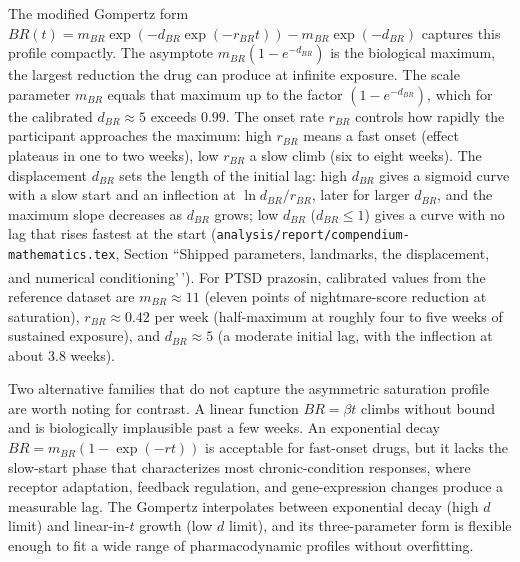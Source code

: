 \documentclass[
  11pt,
]{article}
\begin{document}
The modified Gompertz form \(BR(t) = m_{BR}\exp(-d_{BR}\exp(-r_{BR}t)) -
m_{BR}\exp(-d_{BR})\) captures this profile compactly. The asymptote \(m_{BR}(1
- e^{-d_{BR}})\) is the biological maximum, the largest reduction the drug can
produce at infinite exposure. The scale parameter \(m_{BR}\) equals that maximum
up to the factor \((1 - e^{-d_{BR}})\), which for the calibrated \(d_{BR} \approx
5\) exceeds \(0.99\). The onset rate \(r_{BR}\) controls how rapidly the
participant approaches the maximum: high \(r_{BR}\) means a fast onset (effect
plateaus in one to two weeks), low \(r_{BR}\) a slow climb (six to eight weeks).
The displacement \(d_{BR}\) sets the length of the initial lag: high \(d_{BR}\)
gives a sigmoid curve with a slow start and an inflection at \(\ln d_{BR} /
r_{BR}\), later for larger \(d_{BR}\), and the maximum slope decreases as \(d_{BR}\)
grows; low \(d_{BR}\) (\(d_{BR} \le 1\)) gives a curve with no lag that rises
fastest at the start (\texttt{analysis/report/compendium-mathematics.tex},
Section ``Shipped parameters, landmarks, the displacement, and numerical
conditioning'\,'). For PTSD prazosin, calibrated values from the\textsuperscript{} reference dataset
are \(m_{BR} \approx 11\) (eleven points of nightmare-score reduction at
saturation), \(r_{BR} \approx 0.42\) per week (half-maximum at roughly four to
five weeks of sustained exposure), and \(d_{BR} \approx 5\) (a moderate initial
lag, with the inflection at about 3.8 weeks).

Two alternative families that do not capture the asymmetric saturation profile
are worth noting for contrast. A linear function \(BR = \beta t\) climbs without
bound and is biologically implausible past a few weeks. An exponential decay
\(BR = m_{BR}(1 - \exp(-r t))\) is acceptable for fast-onset drugs, but it lacks
the slow-start phase that characterizes most chronic-condition responses,
where receptor adaptation, feedback regulation, and gene-expression changes
produce a measurable lag. The Gompertz interpolates between exponential decay
(high \(d\) limit) and linear-in-\(t\) growth (low \(d\) limit), and its
three-parameter form is flexible enough to fit a wide range of pharmacodynamic
profiles without overfitting.
\end{document}
